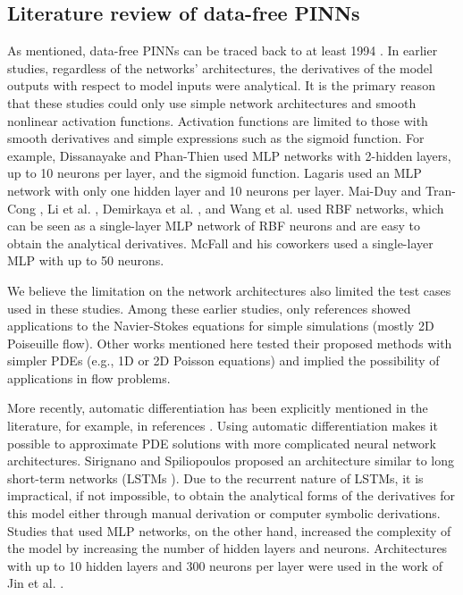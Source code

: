 \subsection*{Literature review of data-free PINNs}

As mentioned, data-free PINNs can be traced back to at least 1994 \cite{dissanayake_neural-network-based_1994}.
In earlier studies, regardless of the networks' architectures, the derivatives of the model outputs with respect to model inputs were analytical.
It is the primary reason that these studies could only use simple network architectures and smooth nonlinear activation functions. 
Activation functions are limited to those with smooth derivatives and simple expressions such as the sigmoid function.
For example, Dissanayake and Phan-Thien \cite{dissanayake_neural-network-based_1994} used MLP networks with 2-hidden layers, up to 10 neurons per layer, and the sigmoid function.
Lagaris \cite{lagaris_artificial_1998} used an MLP network with only one hidden layer and 10 neurons per layer.
Mai-Duy and Tran-Cong \cite{mai-duy_numerical_2001}, Li et al. \cite{li_numerical_2003}, Demirkaya et al. \cite{demirkaya_direct_2008}, and Wang et al. \cite{wang_meshless_2015} used RBF networks, which can be seen as a single-layer MLP network of RBF neurons and are easy to obtain the analytical derivatives.
McFall and his coworkers \cite{McFall2009,mcfall_solving_2010} used a single-layer MLP with up to 50 neurons.

We believe the limitation on the network architectures also limited the test cases used in these studies.
Among these earlier studies, only references \cite{demirkaya_direct_2008,mcfall_solving_2010,wang_meshless_2015} showed applications to the Navier-Stokes equations for simple simulations (mostly 2D Poiseuille flow). 
Other works mentioned here tested their proposed methods with simpler PDEs (e.g., 1D or 2D Poisson equations) and implied the possibility of applications in flow problems.

More recently, automatic differentiation has been explicitly mentioned in the literature, for example, in references \cite{berg_unified_2018,sirignano_dgm:_2018,dockhorn_discussion_2019,raissi_physics-informed_2017,raissi_physics-informed_2019,jin_nsfnets_2020,lu_deepxde:_2021,cai_physics-informed_2021}.
Using automatic differentiation makes it possible to approximate PDE solutions with more complicated neural network architectures.
Sirignano and Spiliopoulos \cite{sirignano_dgm:_2018} proposed an architecture similar to long short-term networks (LSTMs \cite{hochreiter_long_1997}).
Due to the recurrent nature of LSTMs, it is impractical, if not impossible, to obtain the analytical forms of the derivatives for this model either through manual derivation or computer symbolic derivations.
Studies that used MLP networks, on the other hand, increased the complexity of the model by increasing the number of hidden layers and neurons.
Architectures with up to 10 hidden layers and 300 neurons per layer were used in the work of Jin et al. \cite{jin_nsfnets_2020}.

